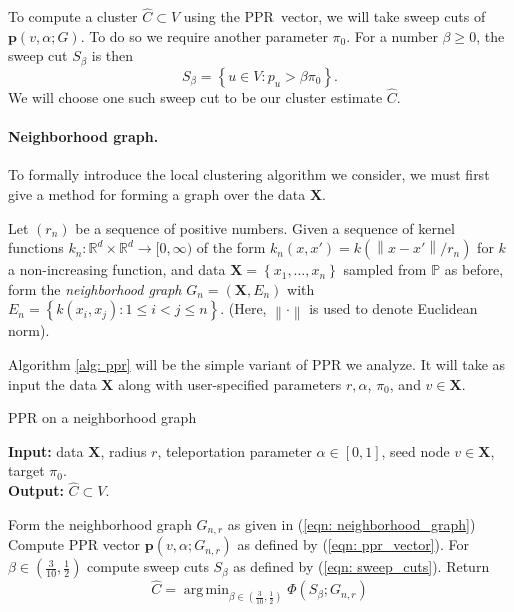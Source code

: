 \documentclass{article}
\newcommand{\set}[1]{\left\{#1\right\}}
\newcommand{\Reals}{\mathbb{R}}
\newcommand{\Rd}{\Reals^d}
\newcommand{\norm}[1]{\left\lVert#1\right\rVert}
\newcommand{\1}{\mathbf{1}}
\newcommand{\pbf}{\mathbf{p}}
\newcommand{\Xbf}{\mathbf{X}}
\newcommand{\Pbb}{\mathbb{P}}
\DeclareMathOperator*{\argmin}{arg\,min}
\newcommand{\pprspace}{{\sc PPR~}}
\theoremstyle{aldenthm}
\theoremstyle{aldenrmrk}
\begin{document}
To compute a cluster $\widehat{C} \subset V$ using the \pprspace vector, we will take sweep cuts of $\pbf(v, \alpha; G)$. To do so we require another parameter $\pi_0$. For a number $\beta \geq 0$, the sweep cut $S_\beta$ is then
\begin{equation}
\label{eqn: sweep_cuts}
S_\beta = \set{u \in V: p_u > \beta \pi_{0}}.
\end{equation}
We will choose one such sweep cut to be our cluster estimate $\widehat{C}$.  

\paragraph{Neighborhood graph.}

To formally introduce the local clustering algorithm we consider, we must first give a method for forming a graph over the data $\Xbf$. 

Let $(r_n)$ be a sequence of positive numbers. Given a sequence of kernel functions $k_n: \Rd \times \Rd \to [0,\infty)$ of the form $k_n(x,x') = k(\norm{x - x'}/ r_n)$ for $k$ a non-increasing function, and data $\Xbf = \set{x_1, \ldots, x_n}$ sampled from $\Pbb$ as before, form the \emph{neighborhood graph} $G_n = (\Xbf, E_n)$ with $E_n = \set{k(x_i,x_j): 1 \leq i < j \leq n}$. (Here, $\norm{\cdot}$ is used to denote Euclidean norm). 

Algorithm \ref{alg: ppr} will be the simple variant of PPR we analyze. It will take as input the data $\Xbf$ along with user-specified parameters $r, \alpha$, $\pi_0$, and $v \in \Xbf$. 
\begin{algorithm}
	\caption{PPR on a neighborhood graph}
	\label{alg: ppr}	
	{\bfseries Input:} data $\Xbf$, radius $r$, teleportation parameter $\alpha \in [0,1]$, seed node $v \in \Xbf$, target $\pi_0$. \\
	{\bfseries Output:} $\widehat{C} \subset V$.
	\begin{algorithmic}[1]
		\STATE Form the neighborhood graph $G_{n,r}$ as given in (\ref{eqn: neighborhood_graph})
		\STATE Compute PPR vector $\pbf(v, \alpha; G_{n,r})$  as defined by (\ref{eqn: ppr_vector}).
		\STATE For $\beta \in (\frac{3}{10}, \frac{1}{2})$ compute sweep cuts $S_{\beta}$ as defined by (\ref{eqn: sweep_cuts}).
		\STATE Return
		\begin{equation*}
		\label{eqn: sweep_cuts_min_conductance}
		\widehat{C} = \argmin_{\beta \in (\frac{3}{10}, \frac{1}{2})} \Phi(S_{\beta}; G_{n,r})
		\end{equation*}
	\end{algorithmic}
\end{algorithm}
\end{document}
